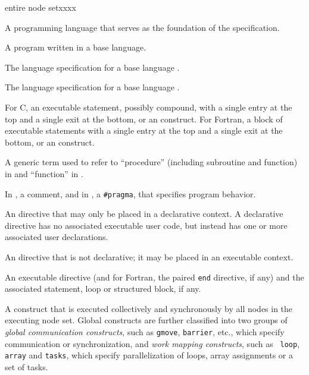 \begin{namelist}{entire node setxxxx}


 A programming language that serves as the foundation of the {\XMP}
 specification.


 A program written in a base language.

\gitem{\XMPF}

 The {\XMP} language specification for a base language {\Fort}.

\gitem{\XMPC}

 The {\XMP} language specification for a base language {\C}.


 For C, an executable statement, possibly compound, with a single entry
 at the top and a single exit at the bottom, or an {\XMP} construct.
 For Fortran, a block of executable statements with a single entry at
 the top and a single exit at the bottom, or an {\XMP} construct.


 A generic term used to refer to ``procedure'' (including subroutine and
 function) in {\XMPF} and ``function'' in {\XMPC}.


 In {\XMPF}, a comment, and in {\XMPC}, a {\tt \#pragma}, that specifies
 {\XMP} program behavior.


 An {\XMP} directive that may only be placed in a declarative context. A
 declarative directive has no associated executable user code, but
 instead has one or more associated user declarations.


 An {\XMP} directive that is not declarative; it may be placed in an
 executable context.


 An {\XMP} executable directive (and for Fortran, the paired {\tt end}
 directive, if any) and the associated statement, loop or structured
 block, if any.



 A construct that is executed collectively and synchronously by all
 nodes in the executing node set. Global constructs are further
 classified into two groups of {\it global communication constructs},
 such as {\tt gmove}, {\tt barrier}, etc., which specify communication
 or synchronization, and {\it work mapping constructs}, such as {\tt
 loop}, {\tt array} and {\tt tasks}, which specify parallelization of
 loops, array assignments or a set of tasks.


\end{namelist}

